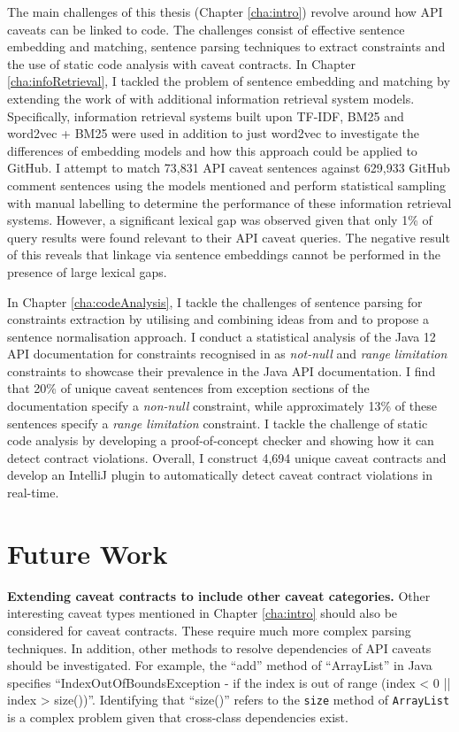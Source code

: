 The main challenges of this thesis (Chapter \ref{cha:intro}) revolve around how API caveats can be linked to code. The challenges consist of effective sentence embedding and matching, sentence parsing techniques to extract constraints and the use of static code analysis with caveat contracts. In Chapter \ref{cha:infoRetrieval}, I tackled the problem of sentence embedding and matching by extending the work of \cite{jiamou} with additional information retrieval system models. Specifically, information retrieval systems built upon TF-IDF, BM25 and word2vec + BM25 were used in addition to just word2vec to investigate the differences of embedding models and how this approach could be applied to GitHub. I attempt to match 73,831 API caveat sentences against 629,933 GitHub comment sentences using the models mentioned and perform statistical sampling with manual labelling to determine the performance of these information retrieval systems. However, a significant lexical gap was observed given that only 1\% of query results were found relevant to their API caveat queries. The negative result of this reveals that linkage via sentence embeddings cannot be performed in the presence of large lexical gaps. \bigbreak

In Chapter \ref{cha:codeAnalysis}, I tackle the challenges of sentence parsing for constraints extraction by utilising and combining ideas from \cite{zhou-directive} and \cite{blasi2018translating} to propose a sentence normalisation approach. I conduct a statistical analysis of the Java 12 API documentation for constraints recognised in \cite{zhou-directive} as \textit{not-null} and \textit{range limitation} constraints to showcase their prevalence in the Java API documentation. I find that 20\% of unique caveat sentences from exception sections of the documentation specify a \textit{non-null} constraint, while approximately 13\% of these sentences specify a \textit{range limitation} constraint. I tackle the challenge of static code analysis by developing a proof-of-concept checker and showing how it can detect contract violations. Overall, I construct 4,694 unique caveat contracts and develop an IntelliJ plugin to automatically detect caveat contract violations in real-time. 

\section{Future Work}
\label{sec:future}

\noindent
\textbf{Extending caveat contracts to include other caveat categories.} Other interesting caveat types mentioned in Chapter \ref{cha:intro} should also be considered for caveat contracts. These require much more complex parsing techniques. In addition, other methods to resolve dependencies of API caveats should be investigated. For example, the ``add'' method of ``ArrayList'' in Java specifies ``IndexOutOfBoundsException - if the index is out of range (index < 0 || index > size())''. Identifying that ``size()'' refers to the \lstinline{size} method of \lstinline{ArrayList} is a complex problem given that cross-class dependencies exist.\\

